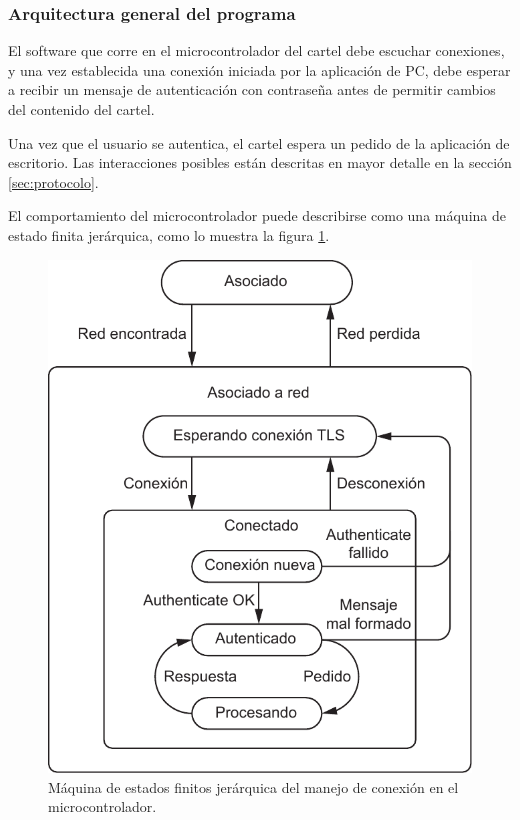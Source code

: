 \subsubsection{Arquitectura general del programa}

El software que corre en el microcontrolador del cartel debe escuchar conexiones, y una vez establecida una conexión iniciada por la aplicación de PC, debe esperar a recibir un mensaje de autenticación con contraseña antes de permitir cambios del contenido del cartel.

Una vez que el usuario se autentica, el cartel espera un pedido de la aplicación de escritorio. Las interacciones posibles están descritas en mayor detalle en la sección \ref{sec:protocolo}.

El comportamiento del microcontrolador puede describirse como una máquina de estado finita jerárquica, como lo muestra la figura \ref{fig:fsm-micro}.

\begin{figure}[ht!]
	\begin{center}
		\centering
		\includegraphics[scale=0.8]{imagenes/fsm-micro.pdf}
		\caption{Máquina de estados finitos jerárquica del manejo de conexión en el microcontrolador.}
		\label{fig:fsm-micro}
	\end{center}
\end{figure}



